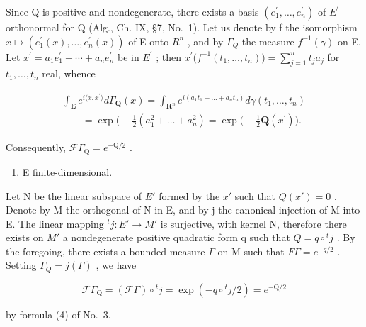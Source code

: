 Since Q is positive and nondegenerate, there exists a basis \((e_{1}^{\prime},\ldots,e_{n}^{\prime})\) of \(E^{\prime}\) orthonormal for Q (Alg., Ch. IX, §7, No.~1). Let us denote by f the isomorphism \(x\mapsto(e_{1}^{\prime}(x),\ldots,e_{n}^{\prime}(x))\) of E onto \(R^{n}\) , and by \(\Gamma_{Q}\) the measure \(f^{-1}(\gamma)\) on E. Let \(x^{\prime}=a_{1}e_{1}^{\prime}+\cdots+a_{n}e_{n}^{\prime}\) be in \(E^{\prime}\) ; then \(x^{\prime}\big(f^{-1}(t_{1},\ldots,t_{n})\big)=\sum_{j=1}^{n}t_{j}a_{j}\) for \(t_{1},\ldots,t_{n}\) real, whence

\[
\begin{array}{l} \int_ {\mathbf {E}} e ^ {i \langle x, x ^ {\prime} \rangle} d \Gamma_ {\mathbf {Q}} (x) = \int_ {\mathbf {R} ^ {n}} e ^ {i (a _ {1} t _ {1} + \dots + a _ {n} t _ {n})} d \gamma (t _ {1}, \ldots , t _ {n}) \\ \qquad = \exp \big (- \frac {1}{2} (a _ {1} ^ {2} + \dots + a _ {n} ^ {2}) = \exp \big (- \frac {1}{2} \mathbf {Q} (x ^ {\prime}) \big). \end{array}
\]

Consequently, \(\mathcal{F}\Gamma_{\mathrm{Q}} = e^{-\mathrm{Q} / 2}\) .

\begin{enumerate}
\def\labelenumi{\Alph{enumi})}
\setcounter{enumi}{1}
\tightlist
\item
  E finite-dimensional.
\end{enumerate}

Let N be the linear subspace of \(E'\) formed by the \(x'\) such that \(Q(x') = 0\) . Denote by M the orthogonal of N in E, and by j the canonical injection of M into E. The linear mapping \({}^{t}j : E' \to M'\) is surjective, with kernel N, therefore there exists on \(M'\) a nondegenerate positive quadratic form q such that \(Q = q \circ {}^{t}j\) . By the foregoing, there exists a bounded measure \(\Gamma\) on M such that \(F\Gamma = e^{-q/2}\) . Setting \(\Gamma_{Q} = j(\Gamma)\) , we have

\[
\mathcal {F} \Gamma_ {\mathrm{Q}} = (\mathcal {F} \Gamma) \circ {} ^ {t} j = \exp (- q \circ {} ^ {t} j / 2) = e ^ {- \mathrm{Q} / 2}
\]

by formula (4) of No.~3.
